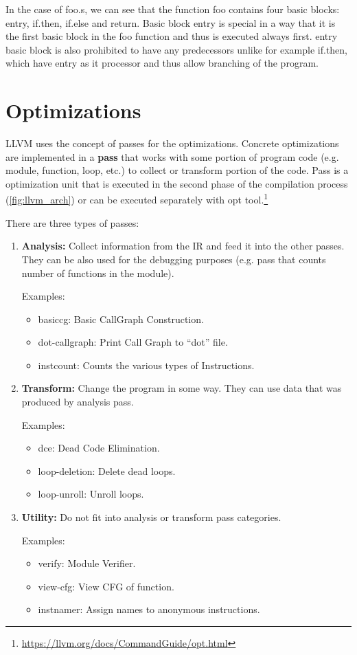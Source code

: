 \documentclass[12pt, twoside]{fithesis2}
\renewcommand{\_}{\leavevmode \kern0.07em\vbox{\hrule width0.4em}}
\newcommand{\squarebullet}{\textcolor{black}{\raisebox{0.15em}{\rule{4pt}{4pt}}}}
\newenvironment{myItemize}{
  \begin{itemize}[
    leftmargin=2em,
    rightmargin=1em,
    itemsep=\parskip,
    parsep=0em,
    topsep=0em,
    partopsep=0em
]
  \renewcommand{\labelitemi}{\squarebullet}
  \renewcommand{\labelitemii}{\textbullet}
}{
  \end{itemize}
}
\newenvironment{myEnumerate}{
  \begin{enumerate}[
    leftmargin=2em,
    rightmargin=1em,
    itemsep=\parskip,
    parsep=0em,
    topsep=0em,
    partopsep=0em
]
}{
  \end{enumerate}
}
\begin{document}
In the case of foo.s, we can see that the function foo contains four basic
blocks: entry, if.then, if.else and return.
Basic block entry is special in a way that it is the first basic block in the
foo function and thus is executed always first. entry basic block is also
prohibited to have any predecessors unlike for example if.then, which have
entry as it processor and thus allow branching of the program.

\section{Optimizations}
\label{sec:llvm-opt}

LLVM uses the concept of passes for the optimizations. Concrete optimizations
are implemented in a \textbf{pass} that works with some portion of program code
(e.g.  module, function, loop, etc.) to collect or transform portion of
the code.
\cite{llvm-passes} Pass is a optimization unit that is executed in the second
phase of the compilation process (\autoref{fig:llvm_arch}) or can be executed
separately with opt tool.\footnote{
\url{https://llvm.org/docs/CommandGuide/opt.html}
}

There are three types of passes:

\begin{myEnumerate}
\item \textbf{Analysis:} Collect information from the IR and feed it into
the other passes. They can be also used for the debugging purposes (e.g.
pass that counts number of functions in the module).

Examples:
\begin{myItemize}
\item basiccg: Basic CallGraph Construction.
\item dot-callgraph: Print Call Graph to “dot” file.
\item instcount: Counts the various types of Instructions.
\end{myItemize}

\item \textbf{Transform:} Change the program in some way. They can use
data that was produced by analysis pass.

Examples:
\begin{myItemize}
\item dce: Dead Code Elimination.
\item loop-deletion: Delete dead loops.
\item loop-unroll: Unroll loops.
\end{myItemize}

\item \textbf{Utility:} Do not fit into analysis or transform pass categories.

Examples:
\begin{myItemize}
\item verify: Module Verifier.
\item view-cfg: View CFG of function.
\item instnamer: Assign names to anonymous instructions.
\end{myItemize}

\end{myEnumerate}
\end{document}

